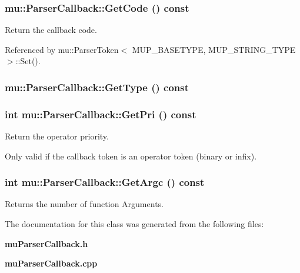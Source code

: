 \subsubsection[GetCode]{ mu::ParserCallback::GetCode () const}\label{classmu_1_1ParserCallback_8aba600cfcc29227674ec367f6dca6dd}


Return the callback code. 



Referenced by mu::ParserToken$<$ MUP\_\-BASETYPE, MUP\_\-STRING\_\-TYPE $>$::Set().
\subsubsection[GetType]{ mu::ParserCallback::GetType () const}\label{classmu_1_1ParserCallback_6744d48241d12c0643141764184bb373}


\subsubsection[GetPri]{\setlength{\rightskip}{0pt plus 5cm}int mu::ParserCallback::GetPri () const}\label{classmu_1_1ParserCallback_09b1100b5b0f69b6258a0412ad0f108e}


Return the operator priority. 

Only valid if the callback token is an operator token (binary or infix). 
\subsubsection[GetArgc]{\setlength{\rightskip}{0pt plus 5cm}int mu::ParserCallback::GetArgc () const}\label{classmu_1_1ParserCallback_a37c90de1b1110639484ac9d139210a2}


Returns the number of function Arguments. 



The documentation for this class was generated from the following files:\begin{CompactItemize}
\item 
{\bf muParserCallback.h}\item 
{\bf muParserCallback.cpp}\end{CompactItemize}
